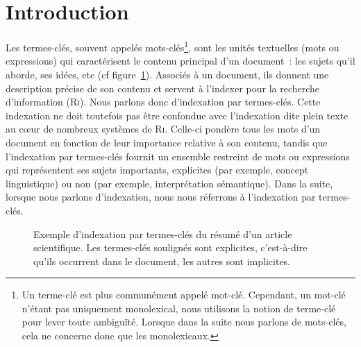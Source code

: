   \section{Introduction}
  \label{sec:main-state_of_the_art-introduction}
    Les termes-clés,
    souvent appelés mots-clés\footnote{Un terme-clé est plus communément appelé
    mot-clé. Cependant, un mot-clé n'étant pas uniquement monolexical, nous
    utilisons la notion de terme-clé pour lever toute ambiguïté. Lorsque dans la
    suite nous parlons de mots-clés, cela ne concerne donc que les
    monolexicaux.}, sont les unités textuelles (mots ou expressions) qui
    caractérisent le contenu principal d'un document~: les sujets qu'il aborde,
    ses idées, etc (cf
    figure~\ref{fig:main-state_of_the_art-introduction-example_keyphrase_annotation}).
    Associés à un document, ils donnent une description précise de son contenu
    et servent à l'indexer pour la recherche d'information (\textsc{Ri}). Nous
    parlons donc d'indexation par termes-clés. Cette indexation ne doit toutefois pas être confondue
    avec l'indexation dite \og{}plein texte\fg{} au c\oe{}ur de nombreux
    systèmes de \textsc{Ri}. Celle-ci pondère tous les mots d'un document en
    fonction de leur importance relative à son contenu, tandis que l'indexation
    par termes-clés fournit un ensemble restreint de mots ou expressions qui
    représentent ses sujets importants, explicites (par exemple, \og{}concept
    linguistique\fg{}) ou non (par exemple, \og{}interprétation
    sémantique\fg{}). Dans la suite, lorsque nous parlons d'indexation, nous
    nous réferrons à l'indexation par termes-clés.
    \begin{figure}
      \caption[Exemple d'indexation par termes-clés du résumé d'un article
        scientifique]{
        Exemple d'indexation par termes-clés du résumé d'un article
        scientifique. Les termes-clés soulignés sont explicites, c'est-à-dire
        qu'ils occurrent dans le document, les autres sont implicites.
        \label{fig:main-state_of_the_art-introduction-example_keyphrase_annotation}
      }
    \end{figure}    

